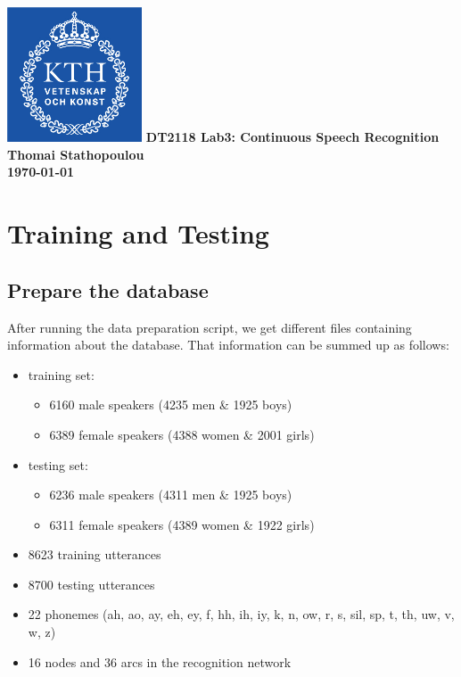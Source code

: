 \documentclass[12pt,a4paper,oneside]{article}
\begin{document}
\begin{titlepage}

\centering
	\includegraphics[width=4cm]{logo.jpg}
	\vfill
    {\bfseries\Large
        DT2118 Lab3: Continuous Speech Recognition
        \vskip1cm
        Thomai Stathopoulou\\
        \vskip1cm
        \today
    }    
   \vfill
\end{titlepage}

\section{Training and Testing}
\subsection{Prepare the database}
After running the data preparation script, we get different files containing information about the database. That information can be summed up as follows:
\begin{itemize}
\item training set:
	\begin{itemize}
	\item 6160 male speakers (4235 men \& 1925 boys)
	\item 6389 female speakers (4388 women \& 2001 girls)
	\end{itemize}
\item testing set:
	\begin{itemize}
	\item 6236 male speakers (4311 men \& 1925 boys)
	\item 6311 female speakers (4389 women \& 1922 girls)
	\end{itemize}
\item 8623 training utterances
\item 8700 testing utterances
\item 22 phonemes (ah, ao, ay, eh, ey, f, hh, ih, iy, k, n, ow, r, s, sil, sp, t, th, uw, v, w, z)
\item 16 nodes and 36 arcs in the recognition network
\end{itemize}
\end{document}
